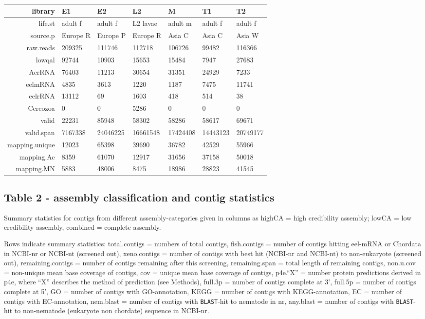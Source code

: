 \documentclass[10pt]{bmc_article}
\newenvironment{bmcformat}{\begin{raggedright}\baselineskip20pt\sloppy\setboolean{publ}{false}}{\end{raggedright}\baselineskip20pt\sloppy}
\begin{document}
\begin{bmcformat}
\begin{tabular}{rllllll}
   \hline
library & E1 & E2 & L2 & M & T1 & T2 \\ 
   \hline
life.st & adult f & adult f & L2 lavae & adult m & adult f & adult f \\ 
  source.p & Europe R & Europe P & Europe R & Asia C & Asia C & Asia W \\ 
  raw.reads & 209325 & 111746 & 112718 & 106726 & 99482 & 116366 \\ 
  lowqal & 92744 & 10903 & 15653 & 15484 & 7947 & 27683 \\ 
  AcrRNA & 76403 & 11213 & 30654 & 31351 & 24929 & 7233 \\ 
   \hline
eelmRNA & 4835 & 3613 & 1220 & 1187 & 7475 & 11741 \\ 
  eelrRNA & 13112 & 69 & 1603 & 418 & 514 & 38 \\ 
  Cercozoa & 0 & 0 & 5286 & 0 & 0 & 0 \\ 
  valid & 22231 & 85948 & 58302 & 58286 & 58617 & 69671 \\ 
  valid.span & 7167338 & 24046225 & 16661548 & 17424408 & 14443123 & 20749177 \\ 
  mapping.unique & 12023 & 65398 & 39690 & 36782 & 42529 & 55966 \\ 
  mapping.Ac &  8359 & 61070 & 12917 & 31656 & 37158 & 50018 \\ 
  mapping.MN &  5883 & 48006 &  8475 & 18986 & 28823 & 41545 \\ 
  \end{tabular}
\subsection*{Table 2 - assembly classification and contig statistics}

Summary statistics for contigs from different assembly-categories
given in columns as highCA = high credibility assembly; lowCA = low
credibility assembly, combined = complete assembly.

Rows indicate summary statistics: total.contigs = numbers of total
contigs, fish.contigs = number of contigs hitting eel-mRNA or Chordata
in NCBI-nr or NCBI-nt (screened out), xeno.contigs = number of contigs
with best hit (NCBI-nr and NCBI-nt) to non-eukaryote (screened out),
remaining.contigs = number of contigs remaining after this screening,
remaining.span = total length of remaining contigs, non.u.cov =
non-unique mean base coverage of contigs, cov = unique mean base
coverage of contigs, p4e.``X'' = number protein predictions derived in
p4e, where ``X'' describes the method of prediction (see Methods),
full.3p = number of contigs complete at 3', full.5p = number of
contigs complete at 5', GO = number of contigs with GO-annotation,
KEGG = number of contigs with KEGG-annotation, EC = number of contigs
with EC-annotation, nem.blast = number of contigs with
\texttt{BLAST}-hit to nematode in nr, any.blast = number of contigs
with \texttt{BLAST}-hit to non-nematode (eukaryote non chordate)
sequence in NCBI-nr.



\end{bmcformat}
\end{document}
